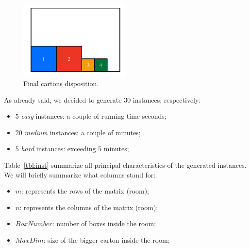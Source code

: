 \documentclass[headinclude, footinclude, abstract=on]{scrarticle}
\begin{document}
\begin{figure}[ht]
	\centering
	\includegraphics[width=0.5\textwidth]{images/representation.jpg}
    \caption{Final cartons disposition.}
    \label{fig:rep}
\end{figure}

As already said, we decided to generate 30 instances; respectively: 
\begin{itemize}
    \item 5 \textit{easy} instances: a couple of running time seconds;
    \item 20 \textit{medium} instances: a couple of minutes;
    \item 5 \textit{hard} instances: exceeding 5 minutes;
\end{itemize}

Table~\ref{tbl:inst} summarize all principal characteristics of the generated instances.
We will briefly summarize what columns stand for:
\begin{itemize}
    \item $m$: represents the rows of the matrix (room);
    \item $n$: represents the columns of the matrix (room);
    \item $BoxNumber$: number of boxes inside the room;
    \item $MaxDim$: size of the bigger carton inside the room;
\end{itemize}
\end{document}

